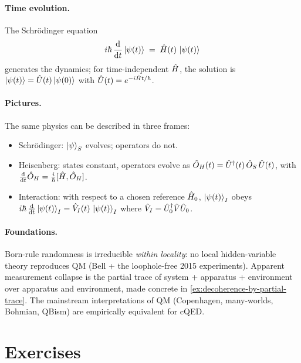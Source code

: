\begin{chaptersummary}
\paragraph{Time evolution.}
The Schr\"odinger equation
\begin{equation}
i\hbar\,\dv{t}\ket{\psi(t)} \;=\; \hat{H}(t)\,\ket{\psi(t)}
\end{equation}
generates the dynamics; for time-independent $\hat{H}$, the
solution is $\ket{\psi(t)}=\hat{U}(t)\ket{\psi(0)}$ with
$\hat{U}(t)=e^{-i\hat{H}t/\hbar}$.

\paragraph{Pictures.}
The same physics can be described in three frames:
\begin{itemize}
  \item Schr\"odinger: $\ket{\psi}_S$ evolves; operators do not.
  \item Heisenberg: states constant, operators evolve as
        $\hat{O}_H(t)=\hat{U}^\dagger(t)\,\hat{O}_S\,\hat{U}(t)$, with
        $\dv{t}\hat{O}_H=\tfrac{i}{\hbar}[\hat{H},\hat{O}_H]$.
  \item Interaction: with respect to a chosen reference $\hat{H}_0$,
        $\ket{\psi(t)}_I$ obeys
        $i\hbar\,\dv{t}\ket{\psi(t)}_I=\hat{V}_I(t)\,\ket{\psi(t)}_I$
        where $\hat{V}_I=\hat{U}_0^\dagger\hat{V}\hat{U}_0$.
\end{itemize}

\paragraph{Foundations.}
Born-rule randomness is irreducible \emph{within locality}: no
local hidden-variable theory reproduces QM (Bell + the loophole-free
2015 experiments). Apparent measurement collapse is the partial
trace of system + apparatus + environment over apparatus and
environment, made concrete in \cref{ex:decoherence-by-partial-trace}.
The mainstream interpretations of QM (Copenhagen, many-worlds,
Bohmian, QBism) are empirically equivalent for cQED.

\end{chaptersummary}

\section*{Exercises}

